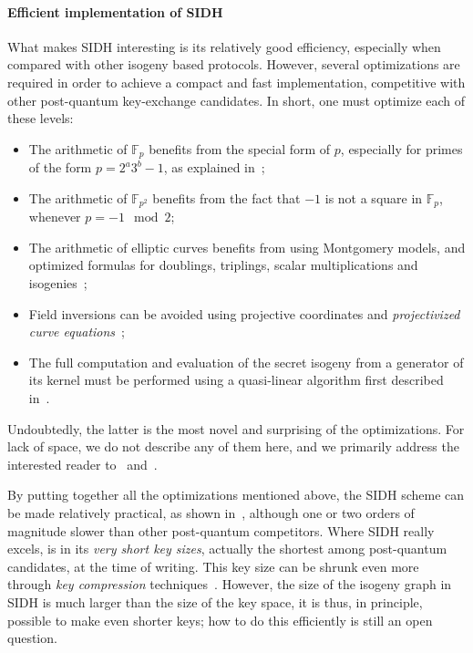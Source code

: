 \documentclass[10pt]{article}
\theoremstyle{plain}
\theoremstyle{definition}
\def\F{\ensuremath{\mathbb{F}}}
\begin{document}
\paragraph{Efficient implementation of SIDH}
What makes SIDH interesting is its relatively good efficiency,
especially when compared with other isogeny based protocols. %
However, several optimizations are required in order to achieve a
compact and fast implementation, competitive with other post-quantum
key-exchange candidates. %
In short, one must optimize each of these levels:
\begin{itemize}
\item The arithmetic of $\F_p$ benefits from the special form of
  $p$, especially for primes of the form $p=2^a3^b-1$, as explained
  in~\cite{costello2016sidh,vercauteren-sidh-fp,cryptoeprint:2016:986};
\item The arithmetic of $\F_{p^2}$ benefits from the fact that $-1$ is
  not a square in $\F_p$, whenever $p=-1\mod 2$;
\item The arithmetic of elliptic curves benefits from using Montgomery
  models, and optimized formulas for doublings, triplings, scalar
  multiplications and
  isogenies~\cite{defeo+jao+plut12,costello2016sidh,cryptoeprint:2017:504,cryptoeprint:2017:1015};
\item Field inversions can be avoided using projective coordinates and
  \emph{projectivized curve equations}~\cite{costello2016sidh};
\item The full computation and evaluation of the secret isogeny from a
  generator of its kernel must be performed using a quasi-linear
  algorithm first described in~\cite{defeo+jao+plut12}.
\end{itemize}

Undoubtedly, the latter is the most novel and surprising of the
optimizations. %
For lack of space, we do not describe any of them here, and we
primarily address the interested reader to~\cite{defeo+jao+plut12}
and~\cite{costello2016sidh}.

By putting together all the optimizations mentioned above, the SIDH
scheme can be made relatively practical, as shown
in~\cite{defeo+jao+plut12,costello2016sidh}, although one or two
orders of magnitude slower than other post-quantum competitors. %
Where SIDH really excels, is in its \emph{very short key sizes},
actually the shortest among post-quantum candidates, at the time of
writing. %
This key size can be shrunk even more through \emph{key compression}
techniques~\cite{azarderakhsh2016key,Costello2017}. %
However, the size of the isogeny graph in SIDH is much larger than the
size of the key space, it is thus, in principle, possible to make even
shorter keys; how to do this efficiently is still an open question.
\end{document}
